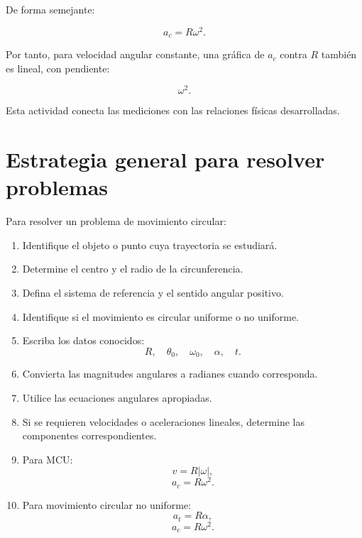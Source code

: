De forma semejante:

\[
a_c=R\omega^2.
\]

Por tanto, para velocidad angular constante, una gráfica de \(a_c\) contra \(R\)
también es lineal, con pendiente:

\[
\omega^2.
\]

Esta actividad conecta las mediciones con las relaciones físicas desarrolladas.


\section{Estrategia general para resolver problemas}

\begin{estrategia}

Para resolver un problema de movimiento circular:

\begin{enumerate}

    \item Identifique el objeto o punto cuya trayectoria se estudiará.

    \item Determine el centro y el radio de la circunferencia.

    \item Defina el sistema de referencia y el sentido angular positivo.

    \item Identifique si el movimiento es circular uniforme o no uniforme.

    \item Escriba los datos conocidos:
    \[
    R,\quad
    \theta_0,\quad
    \omega_0,\quad
    \alpha,\quad
    t.
    \]

    \item Convierta las magnitudes angulares a radianes cuando corresponda.

    \item Utilice las ecuaciones angulares apropiadas.

    \item Si se requieren velocidades o aceleraciones lineales, determine las
    componentes correspondientes.

    \item Para MCU:
    \[
    v=R|\omega|,
    \]
    \[
    a_c=R\omega^2.
    \]

    \item Para movimiento circular no uniforme:
    \[
    a_t=R\alpha,
    \]
    \[
    a_c=R\omega^2.
    \]


\end{enumerate}
\end{estrategia}
